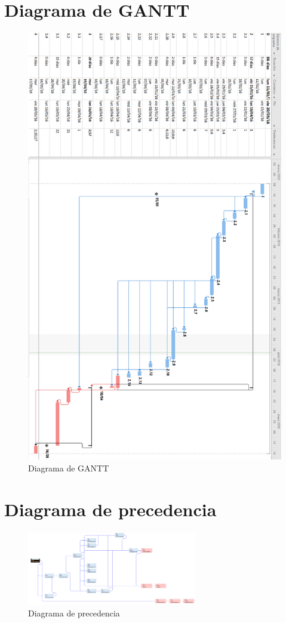 \documentclass{DeustoFDP}
\begin{document}
\section{Diagrama de GANTT}
\begin{figure}[H]
    \centering
    \includegraphics[width=340pt]{fig/gantt}
    \caption{Diagrama de GANTT}\label{fig:gantt}
\end{figure}
\newpage
\section{Diagrama de precedencia}
\begin{figure}[H]
    \centering
    \includegraphics[width=210pt]{fig/precedencia}
    \caption{Diagrama de precedencia}\label{fig:precedencia}
\end{figure}
\end{document}
